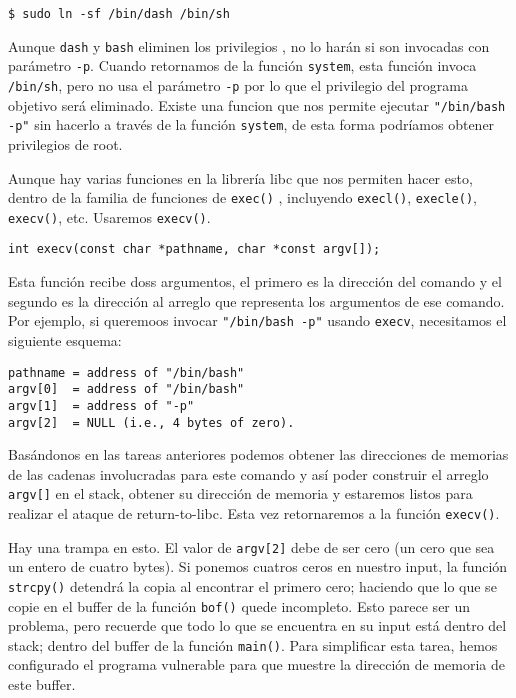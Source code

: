 \begin{lstlisting}
$ sudo ln -sf /bin/dash /bin/sh
\end{lstlisting}

Aunque \texttt{dash} y \texttt{bash} eliminen los privilegios \setuid, no lo harán si son invocadas con parámetro \texttt{-p}. Cuando retornamos de la función \texttt{system}, esta función invoca \texttt{/bin/sh}, pero no usa el parámetro \texttt{-p} por lo que el privilegio \setuid del programa objetivo será eliminado. Existe una funcion que nos permite ejecutar \texttt{"/bin/bash -p"} sin hacerlo a través de la función \texttt{system}, de esta forma podríamos obtener privilegios de root.

Aunque hay varias funciones en la librería libc que nos permiten hacer esto, dentro de la familia de funciones de \texttt{exec()} , incluyendo \texttt{execl()}, \texttt{execle()}, \texttt{execv()}, etc. Usaremos \texttt{execv()}.


\begin{lstlisting}
int execv(const char *pathname, char *const argv[]);
\end{lstlisting}
 
 
Esta función recibe doss argumentos, el primero es la dirección del comando y el segundo es la dirección al arreglo que representa los argumentos de ese comando. Por ejemplo, si queremoos invocar \texttt{"/bin/bash -p"} usando  \texttt{execv}, necesitamos el siguiente esquema:

\begin{lstlisting}
pathname = address of "/bin/bash" 
argv[0]  = address of "/bin/bash"
argv[1]  = address of "-p"
argv[2]  = NULL (i.e., 4 bytes of zero).
\end{lstlisting}
 
Basándonos en las tareas anteriores podemos obtener las direcciones de memorias de las cadenas involucradas para este comando y así poder construir el arreglo \texttt{argv[]} en el stack, obtener su dirección de memoria y estaremos listos para realizar el ataque de return-to-libc. Esta vez retornaremos a la función  \texttt{execv()}.

Hay una trampa en esto. El valor de \texttt{argv[2]} debe de ser cero (un cero que sea un entero de cuatro bytes). Si ponemos cuatros ceros en nuestro input, la función \texttt{strcpy()} detendrá la copia al encontrar el primero cero; haciendo que lo que se copie en el buffer de la función \texttt{bof()} quede incompleto. Esto parece ser un problema, pero recuerde que todo lo que se encuentra en su input está dentro del stack; dentro del buffer de la función \texttt{main()}. Para simplificar esta tarea, hemos configurado el programa vulnerable para que muestre la dirección de memoria de este buffer.
 
